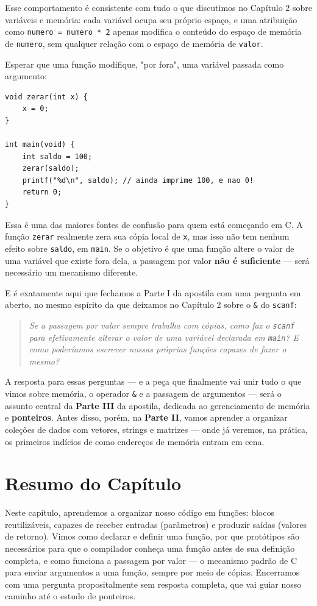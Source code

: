 \documentclass[12pt,a4paper,oneside]{extreport}
\begin{document}
Esse comportamento é consistente com tudo o que discutimos no Capítulo 2 sobre variáveis e memória: cada variável ocupa seu próprio espaço, e uma atribuição como \texttt{numero = numero * 2} apenas modifica o conteúdo do espaço de memória de \texttt{numero}, sem qualquer relação com o espaço de memória de \texttt{valor}.

\begin{errocomum}
Esperar que uma função modifique, "por fora", uma variável passada como argumento:
\begin{lstlisting}
void zerar(int x) {
    x = 0;
}

int main(void) {
    int saldo = 100;
    zerar(saldo);
    printf("%d\n", saldo); // ainda imprime 100, e nao 0!
    return 0;
}
\end{lstlisting}
Essa é uma das maiores fontes de confusão para quem está começando em C. A função \texttt{zerar} realmente zera sua cópia local de \texttt{x}, mas isso não tem nenhum efeito sobre \texttt{saldo}, em \texttt{main}. Se o objetivo é que uma função altere o valor de uma variável que existe fora dela, a passagem por valor \textbf{não é suficiente} — será necessário um mecanismo diferente.
\end{errocomum}

E é exatamente aqui que fechamos a Parte I da apostila com uma pergunta em aberto, no mesmo espírito da que deixamos no Capítulo 2 sobre o \texttt{\&} do \texttt{scanf}:

\begin{quote}
\textit{Se a passagem por valor sempre trabalha com cópias, como faz o \texttt{scanf} para efetivamente alterar o valor de uma variável declarada em \texttt{main}? E como poderíamos escrever nossas próprias funções capazes de fazer o mesmo?}
\end{quote}

A resposta para essas perguntas — e a peça que finalmente vai unir tudo o que vimos sobre memória, o operador \texttt{\&} e a passagem de argumentos — será o assunto central da \textbf{Parte III} da apostila, dedicada ao gerenciamento de memória e \textbf{ponteiros}. Antes disso, porém, na \textbf{Parte II}, vamos aprender a organizar coleções de dados com vetores, strings e matrizes — onde já veremos, na prática, os primeiros indícios de como endereços de memória entram em cena.

\section*{Resumo do Capítulo}
Neste capítulo, aprendemos a organizar nosso código em funções: blocos reutilizáveis, capazes de receber entradas (parâmetros) e produzir saídas (valores de retorno). Vimos como declarar e definir uma função, por que protótipos são necessários para que o compilador conheça uma função antes de sua definição completa, e como funciona a passagem por valor — o mecanismo padrão de C para enviar argumentos a uma função, sempre por meio de cópias. Encerramos com uma pergunta propositalmente sem resposta completa, que vai guiar nosso caminho até o estudo de ponteiros.
\end{document}
